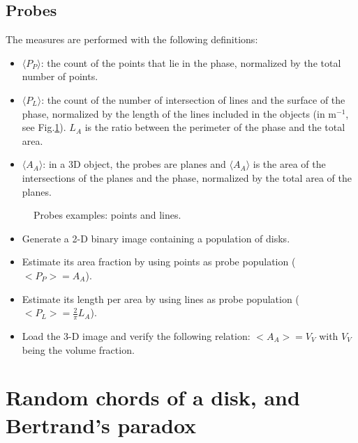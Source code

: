 \subsection{Probes}
 The measures are performed with the following definitions:
\begin{itemize}
 \item $\langle P_P\rangle$: the count of the points that lie in the phase, normalized by the total number of points.
 \item $\langle P_L\rangle$: the count of the number of intersection of lines and the surface of the phase, normalized by the length of the lines included in the objects (in m$^{-1}$, see Fig.\ref{fig:stereology:enonce:PL}). $L_A$ is the ratio between the perimeter of the phase and the total area.
 \item $\langle A_A\rangle$: in a 3D object, the probes are planes and $\langle A_A\rangle$ is the area of the intersections of the planes and the phase, normalized by the total area of the planes.
\end{itemize}
 
\begin{figure}[htbp]
 \centering\caption{Probes examples: points and lines.}%
 \hfill
 \label{fig:stereology:enonce:PL}%
\end{figure}


\begin{qbox}
\begin{itemize}
	\item Generate a 2-D binary image containing a population of disks. 
	\item Estimate its area fraction by using points as probe population ($<P_P>=A_A$).
	\item Estimate its length per area by using lines as probe population ($<P_L>=\frac{2}{\pi}L_A$).
	\item Load the 3-D image and verify the following relation: $<A_A>=V_V$ with $V_V$ being the volume fraction.
	\end{itemize}
\end{qbox}


\section{Random chords of a disk, and Bertrand's paradox}


